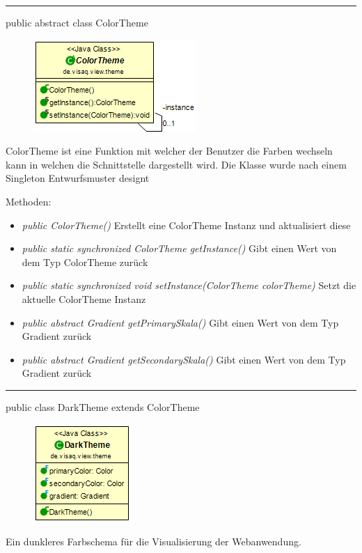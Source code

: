 

\rule{\textwidth}{0.4pt}
public abstract class ColorTheme

\begin{minipage}{0.3\textwidth}
    \begin{figure}[H]
        \includegraphics[scale = 0.5]{media/frontend/view/de.view.elements.theme/ColorTheme_Class.png}
    \end{figure}
    \end{minipage} \hfill
    \begin{minipage}{0.6\textwidth}
ColorTheme ist eine Funktion mit welcher der Benutzer die Farben wechseln kann in welchen die Schnittstelle dargestellt wird. Die Klasse wurde nach einem Singleton Entwurfsmuster designt
\end{minipage} 

Methoden:
\begin{itemize} 
    \item \emph{public ColorTheme()} Erstellt eine ColorTheme Instanz und aktualisiert diese
    \item \emph{public static synchronized ColorTheme getInstance()} Gibt einen Wert von dem Typ ColorTheme zurück
    \item \emph{public static synchronized void setInstance(ColorTheme colorTheme)} Setzt die aktuelle ColorTheme Instanz
    \item \emph{public abstract Gradient getPrimarySkala()} Gibt einen Wert von dem Typ Gradient zurück
    \item \emph{public abstract Gradient getSecondarySkala()}  Gibt einen Wert von dem Typ Gradient zurück
\end{itemize}

\rule{\textwidth}{0.4pt}
public class DarkTheme extends ColorTheme

\begin{minipage}{0.3\textwidth}
    \begin{figure}[H]
        \includegraphics[scale = 0.5]{media/frontend/view/de.view.elements.theme/DarkTheme_Class.png}
    \end{figure}
    \end{minipage} \hfill
    \begin{minipage}{0.6\textwidth}
       Ein dunkleres Farbschema für die Visualisierung der Webanwendung.
    \end{minipage}

